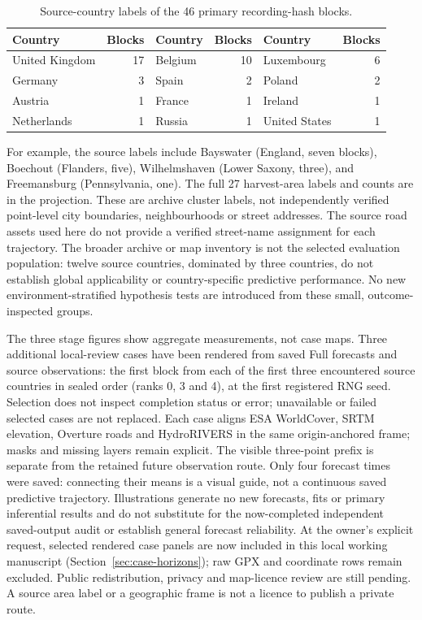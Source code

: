 \documentclass[11pt]{article}
\begin{document}
\begin{table}[htbp]
\centering\small
\caption{Source-country labels of the 46 primary recording-hash blocks.}
\label{tab:geographic-blocks}
\begin{tabular}{lr lr lr}
\toprule
Country & Blocks & Country & Blocks & Country & Blocks\\
\midrule
United Kingdom & 17 & Belgium & 10 & Luxembourg & 6\\
Germany & 3 & Spain & 2 & Poland & 2\\
Austria & 1 & France & 1 & Ireland & 1\\
Netherlands & 1 & Russia & 1 & United States & 1\\
\bottomrule
\end{tabular}
\end{table}

For example, the source labels include Bayswater (England, seven blocks),
Boechout (Flanders, five), Wilhelmshaven (Lower Saxony, three), and
Freemansburg (Pennsylvania, one). The full 27 harvest-area labels and counts
are in the projection. These are archive cluster labels, not independently
verified point-level city boundaries, neighbourhoods or street addresses.
The source road assets used here do not provide a verified street-name
assignment for each trajectory. The broader archive or map inventory is not
the selected evaluation population: twelve source countries, dominated by
three countries, do not establish global applicability or country-specific
predictive performance. No new environment-stratified hypothesis tests are
introduced from these small, outcome-inspected groups.

The three stage figures show aggregate measurements, not case maps. Three
additional local-review cases have been rendered from saved Full forecasts
and source observations: the first block from each of the first three
encountered source countries in sealed order (ranks 0, 3 and 4), at the first
registered RNG seed. Selection does not inspect completion status or error;
unavailable or failed selected cases are not replaced. Each case aligns ESA
WorldCover, SRTM elevation, Overture roads and HydroRIVERS in the same
origin-anchored frame; masks and missing layers remain explicit. The visible
three-point prefix is separate from the retained future observation route.
Only four forecast times were saved: connecting their means is a visual
guide, not a continuous saved predictive trajectory. Illustrations generate
no new forecasts, fits or primary inferential results and do not substitute
for the now-completed independent saved-output audit or establish general
forecast reliability. At the owner's explicit
request, selected rendered case panels are now included in this local working
manuscript (Section~\ref{sec:case-horizons}); raw GPX and coordinate rows
remain excluded. Public redistribution, privacy and map-licence review are
still pending. A source area label or a geographic frame is not a licence
to publish a private route.
\end{document}
